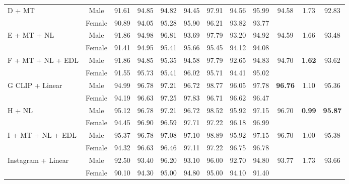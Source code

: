 \documentclass[runningheads]{llncs}
\begin{document}
\begin{table*}[hbtp]
{\begin{tabular}{lccccccccccc}
    \multirow{2}{*}{D   + MT} & Male & 91.61 & 94.85 & 94.82 & 94.45 & 97.91 & 94.56 & 95.99 & \multirow{2}{*}{94.58} & \multirow{2}{*}{1.73} & \multirow{2}{*}{92.83} \\
     & Female & 90.89 & 94.05 & 95.28 & 95.90 & 96.21 & 93.82 & 93.77 &  &  &  \\\cmidrule[0.01pt](lr){2-12}
     
    \multirow{2}{*}{E   + MT + NL} & Male & 91.86 & 94.98 & 96.81 & 93.69 & 97.79 & 93.20 & 94.92 & \multirow{2}{*}{94.59} & \multirow{2}{*}{1.66} & \multirow{2}{*}{93.48} \\
     & Female & 91.41 & 94.95 & 95.41 & 95.66 & 95.45 & 94.12 & 94.08 &  &  &  \\\cmidrule[0.01pt](lr){2-12}
     
    \multirow{2}{*}{F    + MT + NL + EDL} & Male & 91.86 & 94.85 & 95.35 & 94.58 & 97.79 & 92.65 & 94.83 & \multirow{2}{*}{94.70} & \multirow{2}{*}{\textbf{1.62}} & \multirow{2}{*}{93.62} \\
     & Female & 91.55 & 95.73 & 95.41 & 96.02 & 95.71 & 94.41 & 95.02 &  &  &  \\\midrule
     
    \multirow{2}{*}{G CLIP + Linear} & Male & 94.99 & 96.78 & 97.21 & 96.72 & 98.77 & 96.05 & 97.78 & \multirow{2}{*}{\textbf{96.76}} & \multirow{2}{*}{1.10} & \multirow{2}{*}{95.36} \\
     & Female & 94.19 & 96.63 & 97.25 & 97.83 & 96.71 & 96.62 & 96.47 &  &  &  \\\cmidrule[0.01pt](lr){2-12}
     
    \multirow{2}{*}{H   + NL} & Male & 95.12 & 96.78 & 97.21 & 96.72 & 98.52 & 95.92 & 97.15 & \multirow{2}{*}{96.70} & \multirow{2}{*}{\textbf{0.99}} & \multirow{2}{*}{\textbf{95.87}} \\
     & Female & 94.45 & 96.90 & 96.59 & 97.71 & 97.22 & 96.18 & 96.99 &  &  &  \\
      \cmidrule[0.01pt](lr){2-12}
     
    \multirow{2}{*}{I  + MT + NL + EDL} & Male & 95.37 & 96.78 & 97.08 & 97.10 & 98.89 & 95.92 & 97.15 & \multirow{2}{*}{96.70} & \multirow{2}{*}{1.00} & \multirow{2}{*}{95.38} \\
     & Female & 94.32 & 96.63 & 96.46 & 97.11 & 97.22 & 96.75 & 96.78 &  &  &  \\
     
     \midrule
     \midrule
     \multirow{2}{*}{Instagram + Linear~\cite{lp_insta}} & Male & 92.50 & 93.40 & 96.20 & 93.10 & 96.00 & 92.70 & 94.80 & \multirow{2}{*}{93.77} & \multirow{2}{*}{1.73} & \multirow{2}{*}{93.66} \\
     & Female & 90.10 & 94.30 & 95.00 & 94.80 & 95.00 & 94.10 & 91.40 &  &  &  \\
    \bottomrule
    \end{tabular}
    }
\end{table*}
\end{document}
